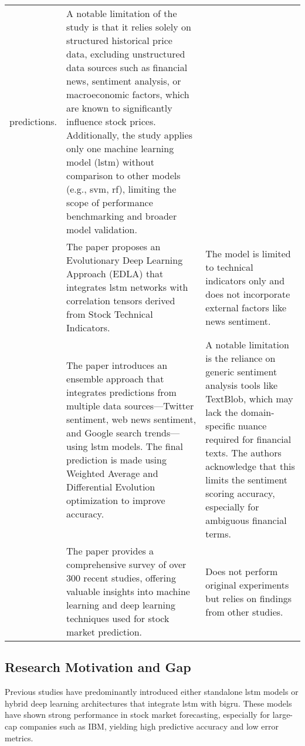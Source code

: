 \begin{longtable}{p{2.5cm}p{5cm}p{5cm}}
     predictions. & A notable limitation of the study is that it relies solely on structured historical
     price data, excluding unstructured data sources such as financial news, sentiment analysis, or 
     macroeconomic factors, which are known to significantly influence stock prices. Additionally, the 
     study applies only one machine learning model (\acrshort{lstm}) without comparison to other models (e.g., 
     \acrshort{svm}, \acrshort{rf}), limiting the scope of performance benchmarking and broader model 
     validation. \\
     \parencite{agrawal2022StockPrediction} & The paper proposes an Evolutionary Deep Learning Approach 
     (EDLA) that integrates \acrshort{lstm} networks with correlation tensors derived from Stock Technical 
     Indicators. & The model is limited to technical indicators only and does not incorporate external 
     factors like news sentiment. \\
     \parencite{parmar2018stock} & The paper introduces an ensemble approach that integrates predictions 
     from multiple data sources—Twitter sentiment, web news sentiment, and Google search trends—using 
     \acrshort{lstm} models. The final prediction is made using Weighted Average and 
     Differential Evolution optimization to improve accuracy. & A notable limitation is the reliance on generic sentiment analysis tools like TextBlob, which may lack the domain-specific nuance required for financial texts. The authors acknowledge that this limits the sentiment scoring accuracy, especially for ambiguous financial terms. \\
     \parencite{balasubramanian2023SystematicSurvey} & The paper provides a comprehensive survey of over 
     300 recent studies, offering valuable insights into machine learning and deep learning techniques used
     for stock market prediction. & Does not perform original experiments but 
     relies on findings from other studies. \\ \hline
\end{longtable}

\subsection{Research Motivation and Gap}

Previous studies have predominantly introduced either standalone \acrfull{lstm} models or hybrid deep 
learning architectures that integrate \acrfull{lstm} with \acrfull{bigru}. These models have shown strong 
performance in stock market forecasting, especially for large-cap companies such as IBM, yielding high 
predictive accuracy and low error metrics.

